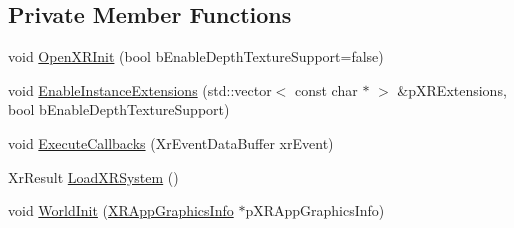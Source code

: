 \subsection*{Private Member Functions}
\begin{DoxyCompactItemize}
\item 
void \mbox{\hyperlink{class_open_x_r_provider_1_1_x_r_provider_a0d19487d4508a89e3554a9fa328b4a05}{Open\+X\+R\+Init}} (bool b\+Enable\+Depth\+Texture\+Support=false)
\item 
void \mbox{\hyperlink{class_open_x_r_provider_1_1_x_r_provider_acd79e785e586d9abcb47977e340a2739}{Enable\+Instance\+Extensions}} (std\+::vector$<$ const char $\ast$ $>$ \&p\+X\+R\+Extensions, bool b\+Enable\+Depth\+Texture\+Support)
\item 
void \mbox{\hyperlink{class_open_x_r_provider_1_1_x_r_provider_a3d9a3ea0c9f8830d17f87fa10424690c}{Execute\+Callbacks}} (Xr\+Event\+Data\+Buffer xr\+Event)
\item 
Xr\+Result \mbox{\hyperlink{class_open_x_r_provider_1_1_x_r_provider_a1bd2735b39ea943cd9e436bb0650bc43}{Load\+X\+R\+System}} ()
\item 
void \mbox{\hyperlink{class_open_x_r_provider_1_1_x_r_provider_a381bae7b1021638036878cad1c0ea3c2}{World\+Init}} (\mbox{\hyperlink{struct_open_x_r_provider_1_1_x_r_app_graphics_info}{X\+R\+App\+Graphics\+Info}} $\ast$p\+X\+R\+App\+Graphics\+Info)
\end{DoxyCompactItemize}
